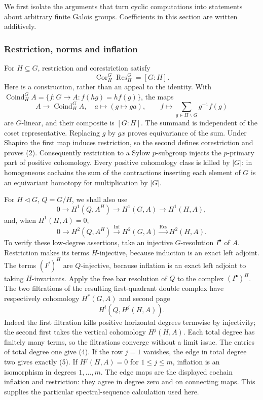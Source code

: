 \documentclass[11pt,a4paper]{article}
\begin{document}
We first isolate the arguments that turn cyclic computations into
statements about arbitrary finite Galois groups. Coefficients in this
section are written additively.

\subsubsection{Restriction, norms and
inflation}\label{restriction-norms-and-inflation}

For \(H\subseteq G\), restriction and corestriction satisfy \[
\operatorname{Cor}_H^G\operatorname{Res}_H^G=[G:H].
\tag{2}
\] Here is a construction, rather than an appeal to the identity. With
\(\operatorname{Coind}_H^G A=\{f:G\to A:f(hg)=hf(g)\}\), the maps \[
A\longrightarrow\operatorname{Coind}_H^G A,\quad a\longmapsto(g\mapsto ga),
\qquad
f\longmapsto\sum_{g\in H\backslash G}g^{-1}f(g)
\tag{3}
\] are \(G\)-linear, and their composite is \([G:H]\). The summand is
independent of the coset representative. Replacing \(g\) by \(gx\)
proves equivariance of the sum. Under Shapiro the first map induces
restriction, so the second defines corestriction and proves (2).
Consequently restriction to a Sylow \(p\)-subgroup injects the
\(p\)-primary part of positive cohomology. Every positive cohomology
class is killed by \(|G|\): in homogeneous cochains the sum of the
contractions inserting each element of \(G\) is an equivariant homotopy
for multiplication by \(|G|\).

For \(H\triangleleft G\), \(Q=G/H\), we shall also use \[
0\to H^1(Q,A^H)\to H^1(G,A)\to H^1(H,A),
\tag{4}
\] and, when \(H^1(H,A)=0\), \[
0\to H^2(Q,A^H)\xrightarrow{\mathrm{Inf}}H^2(G,A)
\xrightarrow{\mathrm{Res}}H^2(H,A).
\tag{5}
\] To verify these low-degree assertions, take an injective
\(G\)-resolution \(I^\bullet\) of \(A\). Restriction makes its terms
\(H\)-injective, because induction is an exact left adjoint. The terms
\((I^j)^H\) are \(Q\)-injective, because inflation is an exact left
adjoint to taking \(H\)-invariants. Apply the free bar resolution of
\(Q\) to the complex \((I^\bullet)^H\). The two filtrations of the
resulting first-quadrant double complex have respectively cohomology
\(H^*(G,A)\) and second page \[
H^i(Q,H^j(H,A)).
\tag{6}
\] Indeed the first filtration kills positive horizontal degrees
termwise by injectivity; the second first takes the vertical cohomology
\(H^j(H,A)\). Each total degree has finitely many terms, so the
filtrations converge without a limit issue. The entries of total degree
one give (4). If the row \(j=1\) vanishes, the edge in total degree two
gives exactly (5). If \(H^j(H,A)=0\) for \(1\leq j\leq m\), inflation is
an isomorphism in degrees \(1,\ldots,m\). The edge maps are the
displayed cochain inflation and restriction: they agree in degree zero
and on connecting maps. This supplies the particular spectral-sequence
calculation used here.
\end{document}
